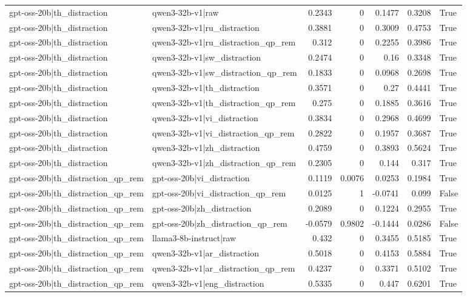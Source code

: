 \begin{table}
\begin{tabular}{l l r r r r l}
gpt-oss-20b|th_distraction & qwen3-32b-v1|raw & 0.2343 & 0 & 0.1477 & 0.3208 & True \\
gpt-oss-20b|th_distraction & qwen3-32b-v1|ru_distraction & 0.3881 & 0 & 0.3009 & 0.4753 & True \\
gpt-oss-20b|th_distraction & qwen3-32b-v1|ru_distraction_qp_rem & 0.312 & 0 & 0.2255 & 0.3986 & True \\
gpt-oss-20b|th_distraction & qwen3-32b-v1|sw_distraction & 0.2474 & 0 & 0.16 & 0.3348 & True \\
gpt-oss-20b|th_distraction & qwen3-32b-v1|sw_distraction_qp_rem & 0.1833 & 0 & 0.0968 & 0.2698 & True \\
gpt-oss-20b|th_distraction & qwen3-32b-v1|th_distraction & 0.3571 & 0 & 0.27 & 0.4441 & True \\
gpt-oss-20b|th_distraction & qwen3-32b-v1|th_distraction_qp_rem & 0.275 & 0 & 0.1885 & 0.3616 & True \\
gpt-oss-20b|th_distraction & qwen3-32b-v1|vi_distraction & 0.3834 & 0 & 0.2968 & 0.4699 & True \\
gpt-oss-20b|th_distraction & qwen3-32b-v1|vi_distraction_qp_rem & 0.2822 & 0 & 0.1957 & 0.3687 & True \\
gpt-oss-20b|th_distraction & qwen3-32b-v1|zh_distraction & 0.4759 & 0 & 0.3893 & 0.5624 & True \\
gpt-oss-20b|th_distraction & qwen3-32b-v1|zh_distraction_qp_rem & 0.2305 & 0 & 0.144 & 0.317 & True \\
gpt-oss-20b|th_distraction_qp_rem & gpt-oss-20b|vi_distraction & 0.1119 & 0.0076 & 0.0253 & 0.1984 & True \\
gpt-oss-20b|th_distraction_qp_rem & gpt-oss-20b|vi_distraction_qp_rem & 0.0125 & 1 & -0.0741 & 0.099 & False \\
gpt-oss-20b|th_distraction_qp_rem & gpt-oss-20b|zh_distraction & 0.2089 & 0 & 0.1224 & 0.2955 & True \\
gpt-oss-20b|th_distraction_qp_rem & gpt-oss-20b|zh_distraction_qp_rem & -0.0579 & 0.9802 & -0.1444 & 0.0286 & False \\
gpt-oss-20b|th_distraction_qp_rem & llama3-8b-instruct|raw & 0.432 & 0 & 0.3455 & 0.5185 & True \\
gpt-oss-20b|th_distraction_qp_rem & qwen3-32b-v1|ar_distraction & 0.5018 & 0 & 0.4153 & 0.5884 & True \\
gpt-oss-20b|th_distraction_qp_rem & qwen3-32b-v1|ar_distraction_qp_rem & 0.4237 & 0 & 0.3371 & 0.5102 & True \\
gpt-oss-20b|th_distraction_qp_rem & qwen3-32b-v1|eng_distraction & 0.5335 & 0 & 0.447 & 0.6201 & True \\

\end{tabular}
\end{table}

